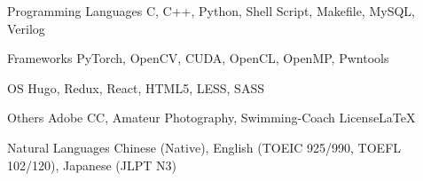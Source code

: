 

\begin{cvskills}

  \cvskill
    {Programming Languages} %
    {C, C++, Python, Shell Script, Makefile, MySQL, Verilog} %

  \cvskill
    {Frameworks} %
    {PyTorch, OpenCV, CUDA, OpenCL, OpenMP, Pwntools} %

  \cvskill
    {OS} %
    {Hugo, Redux, React, HTML5, LESS, SASS} %

  \cvskill
    {Others} %
    {Adobe CC, Amateur Photography, Swimming-Coach License\LaTeX} %

  \cvskill
    {Natural Languages} %
    {Chinese (Native), English (TOEIC 925/990, TOEFL 102/120), Japanese (JLPT N3)} %

\end{cvskills}
